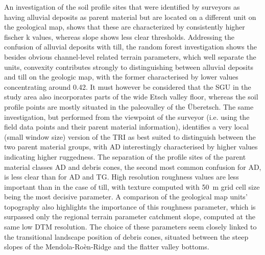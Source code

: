 \documentclass[preprint,12pt,authoryear]{elsarticle}
\begin{document}
An investigation of the soil profile sites that were identified by surveyors as having alluvial deposits as parent material but are located on a different unit on the geological map, shows that these are characterized by consistently higher fischer k values, whereas slope shows less clear thresholds.  
Addressing the confusion of alluvial deposits with till, the random forest investigation shows the besides obvious channel-level related terrain parameters, which well separate the units, convexity contributes strongly to distinguishing between alluvial deposits and till on the geologic map, with the former characterised by lower values concentrating around 0.42. It must however be considered that the SGU in the study area also incorporates parts of the wide Etsch valley floor, whereas the soil profile points are mostly situated in the paleovalley of the {\"U}beretsch.
The same investigation, but performed from the viewpoint of the surveyor (i.e. using the field data points and their parent material information), identifies a very local (small window size) version of the TRI as best suited to distinguish between the two parent material groups, with AD interestingly characterised by higher values indicating higher ruggedness. The separation of the profile sites of the parent material classes AD and debris cones, the second most common confusion for AD, is less clear than for AD and TG. High resolution roughness values are less important than in the case of till, with texture computed with  50~m grid cell size being the most decisive parameter. A comparison of the geological map units' topography also highlights the importance of this roughness parameter, which is surpassed only the regional terrain parameter catchment slope, computed at the same low DTM resolution. The choice of these parameters seem closely linked to the transitional landscape position of debris cones, situated between the steep slopes of the Mendola-Ro\`en-Ridge and the flatter valley bottoms.
\end{document}
